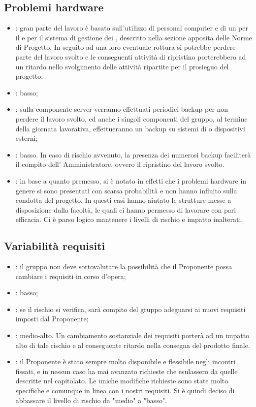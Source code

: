 \subsection{Problemi hardware}
\begin{itemize}
\item {}: gran parte del lavoro è basato sull'utilizzo di personal computer e di un  per il  e per il sistema di gestione dei , descritto nella sezione apposita delle Norme di Progetto. In seguito ad una loro eventuale rottura si potrebbe perdere parte del lavoro svolto e le conseguenti attività di ripristino porterebbero ad un ritardo nello svolgimento delle attività ripartite per il prosieguo del progetto;
\item {}: basso;
\item {}: sulla componente server verranno effettuati periodici backup per non perdere il lavoro svolto, ed anche i singoli componenti del gruppo, al termine della giornata lavorativa, effettueranno un backup su sistemi di  o dispositivi  esterni;
\item {}: basso. In caso di rischio avvenuto, la presenza dei numerosi backup faciliterà il compito dell' Amministratore, ovvero il ripristino del lavoro svolto.
\item {}: in base a quanto premesso, si è notato in effetti che i problemi hardware in genere si sono presentati con scarsa probabilità e non hanno influito sulla condotta del progetto. In questi casi hanno aiutato le strutture messe a disposizione dalla facoltà, le quali ci hanno permesso di lavorare con pari efficacia. Ci è parso logico mantenere i livelli di rischio e impatto inalterati.
\end{itemize}

\subsection{Variabilità requisiti}
\begin{itemize}
\item {}: il gruppo non deve sottovalutare la possibilità che il Proponente possa cambiare i requisiti in corso d'opera;
\item {}: basso;
\item {}: se il rischio si verifica, sarà compito del gruppo adeguarsi ai nuovi requisiti imposti dal Proponente;
\item {}: medio-alto. Un cambiamento sostanziale dei requisiti porterà ad un impatto alto di tale rischio e al conseguente ritardo nella consegna del prodotto finale.
\item {}: il Proponente è stato sempre molto disponibile e flessibile negli incontri fissati, e in nessun caso ha mai avanzato richieste che esulassero da quelle descritte nel capitolato. Le uniche modifiche richieste sono state molto specifiche e comunque in linea con i nostri requisiti. Si è quindi deciso di abbassare il livello di rischio da "medio" a "basso".
\end{itemize}

